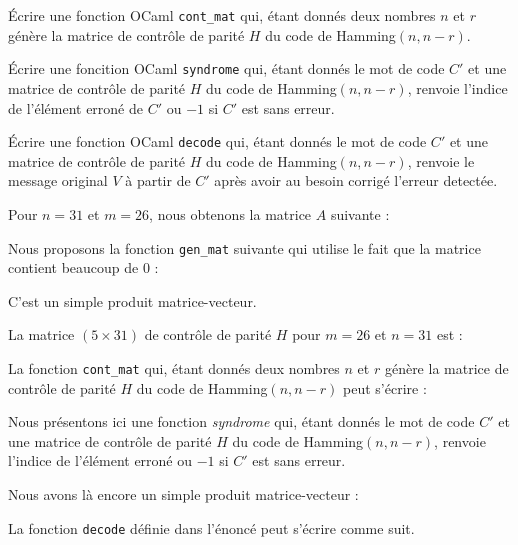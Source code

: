 Écrire une fonction OCaml \texttt{cont\_mat} qui, étant donnés deux nombres $n$ et $r$ génère la matrice de contrôle de parité $H$ du code de Hamming$(n,n-r)$.

\Q
Écrire une foncition OCaml \texttt{syndrome} qui, étant donnés le mot de code $C'$ et une matrice de contrôle de parité $H$ du code de Hamming$(n,n-r)$, renvoie l'indice de l'élément erroné de $C'$ ou $-1$ si $C'$ est sans erreur.
\medskip

Écrire une fonction OCaml \texttt{decode} qui, étant donnés le mot de code $C'$ et une matrice de contrôle de parité $H$ du code de Hamming$(n,n-r)$, renvoie le message original $V$ à partir de $C'$ après avoir au besoin corrigé l'erreur detectée.

\Corrige

\Q
Pour $n=31$ et $m=26$, nous obtenons la matrice $A$ suivante :




Nous proposons la fonction \texttt{gen\_mat} suivante qui utilise le fait que la matrice contient beaucoup de 0 :



\Q
C'est un simple produit matrice-vecteur.



\Q
La matrice $(5 \times 31)$ de contrôle de parité $H$ pour $m=26$ et $n=31$ est :


\medskip

La fonction \texttt{cont\_mat} qui, étant donnés deux nombres $n$ et $r$ génère la matrice de contrôle de parité $H$ du code de Hamming$(n,n-r)$ peut s'écrire :



\Q
Nous présentons ici une fonction \textit{syndrome} qui, étant donnés le mot de code $C'$ et une matrice de contrôle de parité $H$ du code de Hamming$(n,n-r)$, renvoie l'indice de l'élément erroné ou $-1$ si $C'$ est sans erreur.
\medskip

Nous avons là encore un simple produit matrice-vecteur :



La fonction \texttt{decode} définie dans l'énoncé peut s'écrire comme suit.



\Fin
